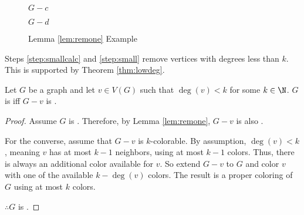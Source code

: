 \begin{figure}[h]
\begin{minipage}{1.25in}
\begin{center}
      \(G-c\)
    \end{center}
  \end{minipage}
  \begin{minipage}{1.25in}
    \begin{center}

      \bigskip

      \(G-d\)
    \end{center}
  \end{minipage}
  \caption{Lemma \ref{lem:remone} Example}
\end{figure}

Steps \ref{step:smallcalc} and \ref{step:small} remove vertices with degrees less than \(k\).  This is supported by
Theorem \ref{thm:lowdeg}.

\begin{theorem}
  \label{thm:lowdeg}
  Let \(G\) be a graph and let \(v\in V(G)\) such that \(\deg(v)<k\) for some \(k\in\N\).  \(G\) is  iff
  \(G-v\) is .
\end{theorem}

\begin{proof}
  Assume \(G\) is .  Therefore, by Lemma \ref{lem:remone}, \(G-v\) is also .

  For the converse, assume that \(G-v\) is \(k\)-colorable.  By assumption, \(\deg(v)<k\), meaning \(v\) has at
  most \(k-1\) neighbors, using at most \(k-1\) colors.  Thus, there is always an additional color available for
  \(v\).  So extend \(G-v\) to \(G\) and color \(v\) with one of the available \(k-\deg(v)\) colors.  The result is
  a proper coloring of \(G\) using at most \(k\) colors.

  \(\therefore G\) is .
\end{proof}

